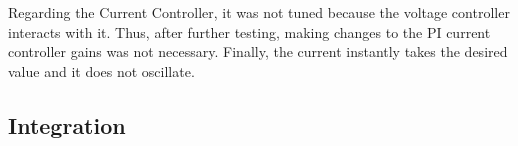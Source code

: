 \documentclass[a4paper]{article}
\begin{document}

Regarding the Current Controller, it was not tuned because the voltage controller
 interacts with it. Thus, after further testing, making changes to the PI current
  controller gains was not necessary. Finally, the current instantly takes the 
  desired value and it does not oscillate. 





\subsection{Integration}
\end{document}
